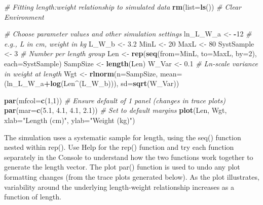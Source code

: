 \documentclass[
]{krantz}
\makeatletter
\newenvironment{Shaded}{\begin{snugshade}}{\end{snugshade}}
\newcommand{\AttributeTok}[1]{\textcolor[rgb]{0.27,0.27,0.27}{#1}}
\newcommand{\CommentTok}[1]{\textcolor[rgb]{0.37,0.37,0.37}{\textit{#1}}}
\newcommand{\DecValTok}[1]{\textcolor[rgb]{0.06,0.06,0.06}{#1}}
\newcommand{\FloatTok}[1]{\textcolor[rgb]{0.06,0.06,0.06}{#1}}
\newcommand{\FunctionTok}[1]{\textcolor[rgb]{0.27,0.27,0.27}{\textbf{#1}}}
\newcommand{\NormalTok}[1]{#1}
\newcommand{\OtherTok}[1]{\textcolor[rgb]{0.37,0.37,0.37}{#1}}
\newcommand{\SpecialCharTok}[1]{\textcolor[rgb]{0.43,0.43,0.43}{\textbf{#1}}}
\newcommand{\StringTok}[1]{\textcolor[rgb]{0.5,0.5,0.5}{#1}}
\newenvironment{kframe}{%
\medskip{}
\setlength{\fboxsep}{.8em}
 \def\at@end@of@kframe{}%
 \ifinner\ifhmode%
  \def\at@end@of@kframe{\end{minipage}}%
  \begin{minipage}{\columnwidth}%
 \fi\fi%
 \def\FrameCommand##1{\hskip\@totalleftmargin \hskip-\fboxsep
 \colorbox{shadecolor}{##1}\hskip-\fboxsep
     \hskip-\linewidth \hskip-\@totalleftmargin \hskip\columnwidth}%
 \MakeFramed {\advance\hsize-\width
   \@totalleftmargin\z@ \linewidth\hsize
   \@setminipage}}%
 {\par\unskip\endMakeFramed%
 \at@end@of@kframe}
\renewenvironment{Shaded}{\begin{kframe}}{\end{kframe}}
\makeatother
\begin{document}
\begin{Shaded}
\begin{Highlighting}[]
\CommentTok{\# Fitting length:weight relationship to simulated data}
\FunctionTok{rm}\NormalTok{(}\AttributeTok{list=}\FunctionTok{ls}\NormalTok{()) }\CommentTok{\# Clear Environment}

\CommentTok{\# Choose parameter values and other simulation settings}
\NormalTok{ln\_L\_W\_a }\OtherTok{\textless{}{-}} \SpecialCharTok{{-}}\DecValTok{12} \CommentTok{\# e.g., L in cm, weight in kg}
\NormalTok{L\_W\_b }\OtherTok{\textless{}{-}} \FloatTok{3.2}
\NormalTok{MinL }\OtherTok{\textless{}{-}} \DecValTok{20}
\NormalTok{MaxL }\OtherTok{\textless{}{-}} \DecValTok{80}
\NormalTok{SystSample }\OtherTok{\textless{}{-}} \DecValTok{3}  \CommentTok{\# Number per length group}
\NormalTok{Len }\OtherTok{\textless{}{-}} \FunctionTok{rep}\NormalTok{(}\FunctionTok{seq}\NormalTok{(}\AttributeTok{from=}\NormalTok{MinL, }\AttributeTok{to=}\NormalTok{MaxL, }\AttributeTok{by=}\DecValTok{2}\NormalTok{), }\AttributeTok{each=}\NormalTok{SystSample)}
\NormalTok{SampSize }\OtherTok{\textless{}{-}} \FunctionTok{length}\NormalTok{(Len)}
\NormalTok{W\_Var }\OtherTok{\textless{}{-}} \FloatTok{0.1} \CommentTok{\# Ln{-}scale variance in weight at length}
\NormalTok{Wgt }\OtherTok{\textless{}{-}} \FunctionTok{rlnorm}\NormalTok{(}\AttributeTok{n=}\NormalTok{SampSize, }\AttributeTok{mean=}\NormalTok{(ln\_L\_W\_a}\SpecialCharTok{+}\FunctionTok{log}\NormalTok{(Len}\SpecialCharTok{\^{}}\NormalTok{(L\_W\_b))),}
              \AttributeTok{sd=}\FunctionTok{sqrt}\NormalTok{(W\_Var))}

\FunctionTok{par}\NormalTok{(}\AttributeTok{mfcol=}\FunctionTok{c}\NormalTok{(}\DecValTok{1}\NormalTok{,}\DecValTok{1}\NormalTok{)) }\CommentTok{\# Ensure default of 1 panel (changes in trace plots)}
\FunctionTok{par}\NormalTok{(}\AttributeTok{mar=}\FunctionTok{c}\NormalTok{(}\FloatTok{5.1}\NormalTok{, }\FloatTok{4.1}\NormalTok{, }\FloatTok{4.1}\NormalTok{, }\FloatTok{2.1}\NormalTok{)) }\CommentTok{\# Set to default margins}
\FunctionTok{plot}\NormalTok{(Len, Wgt, }\AttributeTok{xlab=}\StringTok{"Length (cm)"}\NormalTok{, }\AttributeTok{ylab=}\StringTok{"Weight (kg)"}\NormalTok{)}
\end{Highlighting}
\end{Shaded}

The simulation uses a systematic sample for length, using the seq() function nested within rep(). Use Help for the rep() function and try each function separately in the Console to understand how the two functions work together to generate the length vector. The plot par() function is used to undo any plot formatting changes (from the trace plots generated below). As the plot illustrates, variability around the underlying length-weight relationship increases as a function of length.
\end{document}
